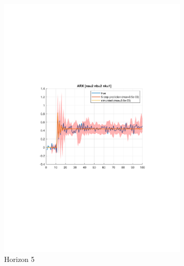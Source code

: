\documentclass[]{article}
\begin{document}
\begin{figure}[ht]
\begin{subfigure}{.30\textwidth}
	\centering
	\includegraphics[trim= 10cm 8cm 10cm 8cm, scale=0.3]{figures/1d-horizon_5.pdf}
	\caption{Horizon 5}
	\label{fig:1d-horizon5}
\end{subfigure}
\begin{subfigure}{.30\textwidth}
	\centering

\end{subfigure}
\end{figure}
\end{document}
